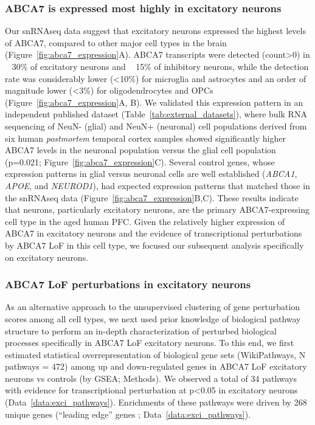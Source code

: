 \documentclass[12pt]{article}
\begin{document}
\subsubsection{ABCA7 is expressed most highly in excitatory neurons}
Our snRNAseq data suggest that excitatory neurons expressed the highest levels of ABCA7, compared to other major cell types in the brain (Figure~\ref{fig:abca7_expression}A).  ABCA7 transcripts were detected (count>0) in ~ 30\% of excitatory neurons and ~ 15\% of inhibitory neurons, while the detection rate was considerably lower (<10\%) for microglia and astrocytes and an order of magnitude lower (<3\%) for oligodendrocytes and OPCs (Figure~\ref{fig:abca7_expression}A, B). We validated this expression pattern in an independent published dataset \cite{Welch2022-ef} (Table~\ref{tab:external_datasets}), where bulk RNA sequencing of NeuN- (glial) and NeuN+ (neuronal) cell populations derived from six human \textit{postmortem} temporal cortex samples showed significantly higher ABCA7 levels in the neuronal population versus the glial cell population (p=0.021; Figure~\ref{fig:abca7_expression}C). Several control genes, whose expression patterns in glial versus neuronal cells are well established (\textit{ABCA1}, \textit{APOE}, and \textit{NEUROD1}), had expected expression patterns that matched those in the snRNAseq data (Figure~\ref{fig:abca7_expression}B,C). These results indicate that neurons, particularly excitatory neurons, are the primary ABCA7-expressing cell type in the aged human PFC. Given the relatively higher expression of ABCA7 in excitatory neurons and the evidence of transcriptional perturbations by ABCA7 LoF in this cell type, we focused our subsequent analysis specifically on excitatory neurons.

\subsubsection{ABCA7 LoF perturbations in excitatory neurons}
As an alternative approach to the unsupervised clustering of gene perturbation scores among all cell types, we next used prior knowledge of biological pathway structure to perform an in-depth characterization of perturbed biological processes specifically in ABCA7 LoF excitatory neurons. To this end, we first estimated statistical overrepresentation of biological gene sets (WikiPathways, N pathways = 472) among up and down-regulated genes in ABCA7 LoF excitatory neurons vs controls (by GSEA; Methods). We observed a total of 34 pathways with evidence for transcriptional perturbation at p<0.05 in excitatory neurons (Data~\ref{data:exci_pathways}). Enrichments of these pathways were driven by 268 unique genes (“leading edge” genes \cite{Subramanian2005-pu}; Data~\ref{data:exci_pathways}).   
\end{document}
